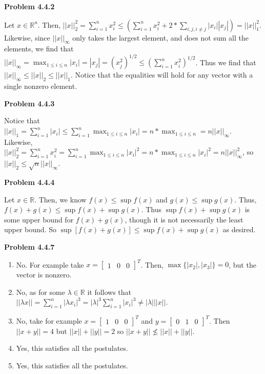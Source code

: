 \documentclass{article}
\def\R{\mathbb{R}}
\newcommand{\Problem}[1]{\textbf{Problem #1}}
\begin{document}
\Problem{4.4.2}

Let $x \in \R^n$. Then, $||x||_2^2 = \displaystyle\sum_{i=1}^n x_i^2 \leq \left(\displaystyle\sum_{i=1}^n x_i^2 +2*\displaystyle\sum_{i,j,i\neq j} |x_i||x_j| \right)= ||x||_1^2$. Likewise, since $||x||_{\infty}$ only takes the largest element, and does not sum all the elements, we find that $||x||_{\infty} = \displaystyle\max_{1 \leq i \leq n} |x_i| = |x_j| = \left(x_j^2\right)^{1/2} \leq \left(\displaystyle\sum_{i=1}^n x_i^2 \right)^{1/2}$. Thus we find that $||x||_{\infty} \leq ||x||_2 \leq ||x||_1$. Notice that the equalities will hold for any vector with a single nonzero element.

\Problem{4.4.3}

Notice that $||x||_1 = \displaystyle\sum_{i=1}^n |x_i| \leq \displaystyle\sum_{i=1}^n \displaystyle\max_{1 \leq i \leq n}|x_i| = n*\displaystyle\max_{1 \leq i \leq n} = n||x||_{\infty}$. Likewise, $||x||_2^2 = \displaystyle\sum_{i=1}^n x_i^2 = \displaystyle\sum_{i=1}^n \displaystyle\max_{1 \leq i \leq n}|x_i|^2 = n*\displaystyle\max_{1 \leq i \leq n}|x_i|^2 = n||x||_{\infty}^2$, so $||x||_2 \leq \sqrt{n}||x||_{\infty}$. 

\Problem{4.4.4}

Let $x \in \R$. Then, we know $f(x) \leq \sup{f(x)}$ and $g(x) \leq \sup{g(x)}$. Thus, $f(x) + g(x) \leq \sup{f(x)} + \sup{g(x)}$. Thus $\sup{f(x)} + \sup{g(x)}$ is some upper bound for $f(x) + g(x)$, though it is not necessarily the least upper bound. So $\sup{[f(x) + g(x)]} \leq \sup{f(x)} + \sup{g(x)}$ as desired. 

\Problem{4.4.7}
	
\begin{enumerate}
\item No. For example take $x = \begin{bmatrix} 1 & 0 & 0 \end{bmatrix}^T$. Then, $\max\{|x_2|,|x_3|\} = 0$, but the vector is nonzero. 
\item No, as for some $\lambda \in \R$ it follows that $||\lambda x|| = \displaystyle\sum_{i=1}^n|\lambda x_i|^3 = |\lambda|^3\displaystyle\sum_{i=1}^n|x_i|^3 \neq |\lambda|||x||$.
\item No, take for example $x = \begin{bmatrix} 1 & 0 & 0 \end{bmatrix}^T$ and $y = \begin{bmatrix} 0 & 1 & 0 \end{bmatrix}^T$. Then $||x + y|| = 4$ but $||x|| + ||y|| = 2$ so $||x + y|| \not\leq ||x|| + ||y||$. 
\item Yes, this satisfies all the postulates. 
\item Yes, this satisfies all the postulates. 
\end{enumerate}
 
\end{document}
